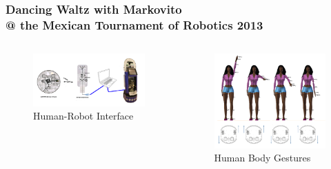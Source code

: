 \documentclass{beamer}
\begin{document}
\begin{frame}
 \frametitle{Dancing Waltz with Markovito \\
 @ the Mexican Tournament of Robotics 2013}

\vspace{-15mm}

\begin{columns}[onlytextwidth]
\begin{column}{0.5\textwidth}
 \begin{figure}
\includegraphics[scale=0.15]{hridd-blockdiagram}
\centering
\caption{Human-Robot Interface}
\end{figure}
\end{column}
\begin{column}{0.5\textwidth}
\begin{figure}
\includegraphics[scale=0.11]{tmr2013demodance}
\centering
\caption{Human Body Gestures}
\end{figure}
    \end{column}
\end{columns}

\end{frame}
\end{document}
